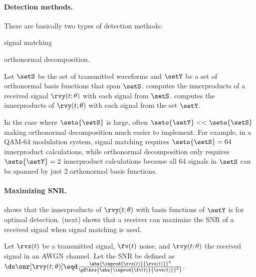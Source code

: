 \paragraph{Detection methods.}
There are basically two types of detection methods:
\begin{enume}
   \item signal matching
   \item orthonormal decomposition.
\end{enume}

Let $\setS$ be the set of transmitted waveforms and
$\setY$ be a set of orthonormal basis functions that span $\setS$.
 computes the innerproducts of a
received signal $\rvy(t;\theta)$ with each signal from $\setS$.
 computes the innerproducts of
$\rvy(t;\theta)$ with each signal from the set $\setY$.

In the case where $\seto{\setS}$ is large, often $\seto{\setY}<<\seto{\setS}$
making orthonormal decomposition much easier to implement.
For example, in a QAM-64 modulation system,
signal matching requires $\seto{\setS}=64$ innerproduct calculations,
while orthonormal decomposition only requires $\seto{\setY}=2$
innerproduct calculations because all 64 signals in $\setS$ can be spanned
by just 2 orthonormal basis functions.

\paragraph{Maximizing SNR.}
 shows that the innerproducts of $\rvy(t;\theta)$ with
basis functions of $\setY$ is  for optimal detection.
 (next) shows that a receiver can
maximize the SNR of a received signal when signal matching is used.

\begin{theorem}
\label{thm:mf_maxSNR}
Let $\rvx(t)$ be a transmitted signal, $\fv(t)$ noise, and $\rvy(t;\theta)$ the received signal
in an AWGN channel.
Let the  SNR be defined as
\\\indentx$\ds
      \snr[\rvy(t;\theta)] \eqd \frac{\abs{\inprod{\rvx(t)}{\rvx(t)}}^2}
                            {\pE\brs{\abs{\inprod{\fv(t)}{\rvx(t)}}^2}}.
          $
\end{theorem}

